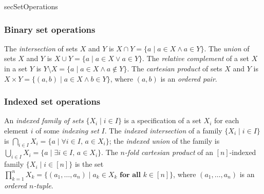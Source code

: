 \begin{tldr}{secSetOperations}

\subsubsection*{Binary set operations}

\begin{tldrlist}
 The \textit{intersection} of sets $X$ and $Y$ is $X \cap Y = \{ a \mid a \in X \wedge a \in Y \}$.
 The \textit{union} of sets $X$ and $Y$ is $X \cup Y = \{ a \mid a \in X \vee a \in Y \}$.
 The \textit{relative complement} of a set $X$ in a set $Y$ is $Y \setminus X = \{ a \mid a \in X \wedge a \not\in Y \}$.
 The \textit{cartesian product} of sets $X$ and $Y$ is $X \times Y = \{ (a,b) \mid a \in X \wedge b \in Y \}$, where $(a,b)$ is an \textit{ordered pair}.
\end{tldrlist}

\subsubsection*{Indexed set operations}

\begin{tldrlist}
 An \textit{indexed family of sets} $\{ X_i \mid i \in I \}$ is a specification of a set $X_i$ for each element $i$ of some \textit{indexing set} $I$.
 The \textit{indexed intersection} of a family $\{ X_i \mid i \in I \}$ is $\bigcap_{i \in I} X_i = \{ a \mid \forall i \in I,\, a \in X_i \}$; the \textit{indexed union} of the family is $\bigcup_{i \in I} X_i = \{ a \mid \exists i \in I,\, a \in X_i \}$.
 The \textit{$n$-fold cartesian product} of an $[n]$-indexed family $\{ X_i \mid i \in [n] \}$ is the set $\prod_{k=1}^n X_k = \{ (a_1, \dots, a_n) \mid a_k \in X_k \textbf{ for all } k \in [n] \}$, where $(a_1, \dots, a_n)$ is an \textit{ordered $n$-tuple}.
\end{tldrlist}

\end{tldr}

